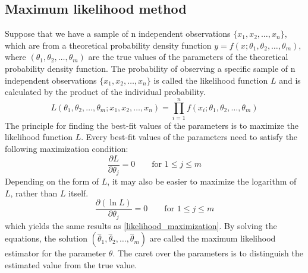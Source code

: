 \documentclass[12pt,a4paper]{report}
\begin{document}
\subsection{Maximum likelihood method \cite{stat_2}}
Suppose that we have a sample of n independent observations $\{ x_1, x_2, \dots , x_n \}$, which are from a theoretical probability density function $y = f(x;\theta_1,\theta_2,\dots,\theta_m)$, where $(\theta_1,\theta_2,\dots,\theta_m)$ are the true values of the parameters of the theoretical probability density function.
The probability of observing a specific sample of n independent observations $\{ x_1, x_2, \dots , x_n \}$ is called the likelihood function $L$ and is calculated by the product of the individual probability.
\begin{equation*}
L(\theta_1,\theta_2,\dots,\theta_m;x_1,x_2,\dots,x_n) = \prod_{i = 1}^{n} f(x_i;\theta_1,\theta_2,\dots,\theta_m)
\end{equation*}
The principle for finding the best-fit values of the parameters is to maximize the likelihood function $L$.
Every best-fit values of the parameters need to satisfy the following maximization condition:
\begin{equation}  \label{likelihood_maximization}
\frac{\partial L}{\partial \theta_j} = 0 \qquad \text{for } 1 \leq  j \leq m
\end{equation}
Depending on the form of $L$, it may also be easier to maximize the logarithm of $L$, rather than $L$ itself.
\begin{equation*}
\frac{\partial ( \ln L )}{\partial \theta_j} = 0 \qquad \text{for } 1 \leq  j \leq m
\end{equation*}
which yields the same results as \ref{likelihood_maximization}.
By solving the equations, the solution $(\hat{\theta}_1,\hat{\theta}_2,\dots,\hat{\theta}_m)$ are called the maximum likelihood estimator for the parameter $\theta$.
The caret over the parameters is to distinguish the estimated value from the true value.
\end{document}
